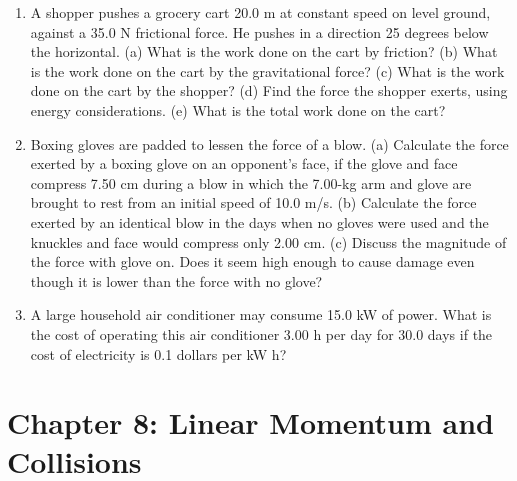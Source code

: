 \documentclass[10pt]{article}
\begin{document}
\begin{enumerate}
\item A shopper pushes a grocery cart 20.0 m at constant speed on level ground, against a 35.0 N frictional force. He pushes in a direction  25 degrees below the horizontal. (a) What is the work done on the cart by friction? (b) What is the work done on the cart by the gravitational force? (c) What is the work done on the cart by the shopper? (d) Find the force the shopper exerts, using energy considerations. (e) What is the total work done on the cart? \\ \vspace{1.5cm}
\item  Boxing gloves are padded to lessen the force of a blow. (a) Calculate the force exerted by a boxing glove on an opponent’s face, if the glove and face compress 7.50 cm during a blow in which the 7.00-kg arm and glove are brought to rest from an initial speed of 10.0 m/s. (b) Calculate the force exerted by an identical blow in the days when no gloves were used and the knuckles and face would compress only 2.00 cm. (c) Discuss the magnitude of the force with glove on. Does it seem high enough to cause damage even though it is lower than the force with no glove? \\ \vspace{2cm}
\item A large household air conditioner may consume 15.0 kW of power. What is the cost of operating this air conditioner 3.00 h per day for 30.0 days if the cost of electricity is 0.1 dollars per kW h? \\ \vspace{1cm}
\end{enumerate}

\section{Chapter 8: Linear Momentum and Collisions}
\end{document}
